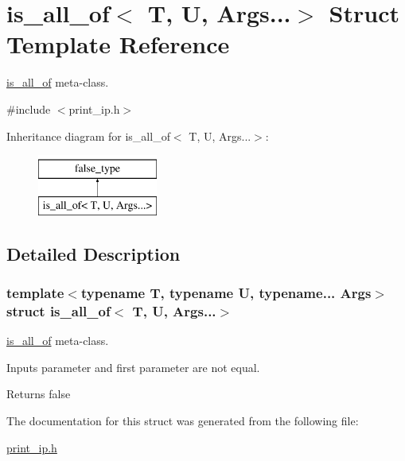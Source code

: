 \hypertarget{structis__all__of_3_01T_00_01U_00_01Args_8_8_8_4}{\section{is\-\_\-all\-\_\-of$<$ T, U, Args...$>$ Struct Template Reference}
\label{structis__all__of_3_01T_00_01U_00_01Args_8_8_8_4}
}


\hyperlink{structis__all__of}{is\-\_\-all\-\_\-of} meta-\/class.  




{\ttfamily \#include $<$print\-\_\-ip.\-h$>$}

Inheritance diagram for is\-\_\-all\-\_\-of$<$ T, U, Args...$>$\-:\begin{figure}[H]
\begin{center}
\leavevmode
\includegraphics[height=2.000000cm]{structis__all__of_3_01T_00_01U_00_01Args_8_8_8_4}
\end{center}
\end{figure}


\subsection{Detailed Description}
\subsubsection*{template$<$typename T, typename U, typename... Args$>$struct is\-\_\-all\-\_\-of$<$ T, U, Args...$>$}

\hyperlink{structis__all__of}{is\-\_\-all\-\_\-of} meta-\/class. 

Inputs parameter and first parameter are not equal. \begin{DoxyReturn}{Returns}
false 
\end{DoxyReturn}


The documentation for this struct was generated from the following file\-:\begin{DoxyCompactItemize}
\item 
\hyperlink{print__ip_8h}{print\-\_\-ip.\-h}\end{DoxyCompactItemize}
